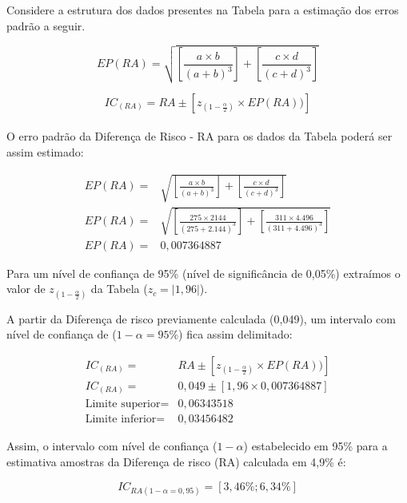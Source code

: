 \documentclass[
]{book}
\begin{document}
\hfill\break

Considere a estrutura dos dados presentes na Tabela para a estimação dos erros padrão a seguir.

\hfill\break

\[
EP(RA) = \sqrt{ \left [ \frac{a \times b}{(a+b)^3} \right ]  + \left [ \frac{c \times d}{(c+d)^3} \right ]  }
\]

\hfill\break

\[
IC_{(RA)} = RA \pm \left[ z_{(1-\frac{\alpha}{2})} \times EP(RA))\right] 
\]\\

O erro padrão da Diferença de Risco - RA para os dados da Tabela poderá ser assim estimado:

\hfill\break

\begin{align*}
EP(RA)  = & \sqrt{ \left [ \frac{a \times b}{(a+b)^3} \right ]  + \left [ \frac{c \times d}{(c+d)^3} \right ]  }\\
EP(RA)  = & \sqrt{ \left [ \frac{275 \times 2144}{(275+2.144)^3} \right ]  + \left [ \frac{311 \times 4.496}{(311+4.496)^3} \right ]  }\\
EP(RA)  = & 0,007364887
\end{align*}

\hfill\break

Para um nível de confiança de 95\% (nível de significância de 0,05\%) extraímos o valor de \(z_{(1-\frac{\alpha}{2})}\) da Tabela (\(z_{c}=|1,96|\)).

\hfill\break

A partir da Diferença de risco previamente calculada (0,049), um intervalo com nível de confiança de (\(1-\alpha=95\%\)) fica assim delimitado:

\hfill\break

\begin{align*}
IC_{(RA)}  = & RA \pm \left[ z_{(1-\frac{\alpha}{2})} \times EP(RA))\right] \\
IC_{(RA)}  = & 0,049 \pm \left[ 1,96  \times 0,007364887 \right] \\
\text{Limite superior}  = & 0,06343518 \\
\text{Limite inferior}  = & 0,03456482
\end{align*}

\hfill\break

Assim, o intervalo com nível de confiança (\(1-\alpha\)) estabelecido em 95\% para a estimativa amostras da Diferença de risco (RA) calculada em 4,9\% é:

\hfill\break

\[
IC_{RA (1-\alpha=0,95)} = [3,46\%  ; 6,34\%]
\]

  
\end{document}
